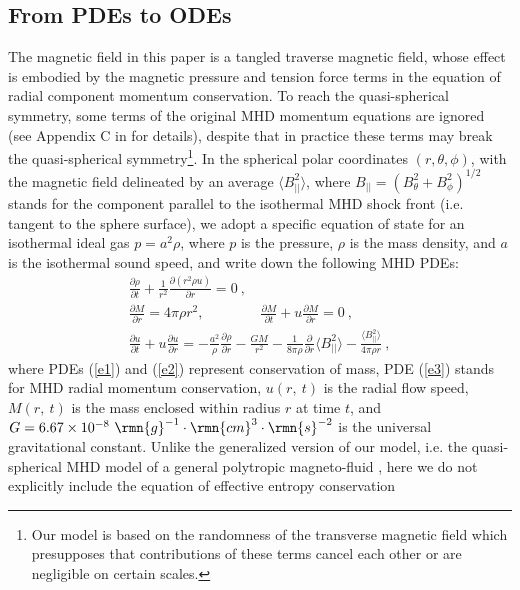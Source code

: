 \documentclass[fleqn,usenatbib]{mnras}
\begin{document}
\subsection{From PDEs to ODEs}
\label{s2.1}
The magnetic field in this paper is a tangled traverse magnetic field, whose effect is embodied by the magnetic pressure and tension force terms in the equation of radial component momentum conservation. To reach the quasi-spherical symmetry, some terms of the original MHD momentum equations are ignored (see Appendix C in \citet{yuLou2005} for details), despite that in practice these terms may break the quasi-spherical symmetry\footnote{Our model is based on the randomness of the transverse magnetic field which presupposes that contributions of these terms cancel each other or are negligible on certain scales.}. In the spherical polar coordinates $(r, \theta,\phi)$, with the magnetic field delineated by an average $\langle B^{2}_{||}\rangle$, where $B_{||}=(B_{\theta}^{2}+B_{\phi}^{2})^{1/2}$ stands for the component parallel to the isothermal MHD shock front (i.e. tangent to the sphere surface), we adopt a specific equation of state for an isothermal ideal gas $p=a^{2}\rho$, where $p$ is the pressure, $\rho$ is the mass density, and $a$ is the isothermal sound speed, and write down the following MHD PDEs:
\begin{gather}
\frac{\partial\rho}{\partial t}+\frac{1}{r^{2}}\frac{\partial
  \left(r^{2}\rho u\right)}{\partial r}=0\ ,\label{e1}\\
\frac{\partial M}{\partial r}=4\pi\rho r^{2},
 \qquad\qquad \frac{\partial M}
  {\partial t}+u\frac{\partial M}{\partial r}=0\ ,\label{e2}\\
\frac{\partial u}{\partial t}+u\frac{\partial u}{\partial r}=-\frac{a^{2}}{\rho}\frac{\partial \rho}
 {\partial r}-\frac{GM}{r^{2}}-\frac{1}{8\pi\rho}
 \frac{\partial}{\partial r}\langle B^{2}_{||}\rangle
 -\frac{\langle B^{2}_{||}\rangle}{4\pi\rho r}\ ,\label{e3}
\end{gather}
where PDEs (\ref{e1}) and (\ref{e2}) represent conservation of mass, PDE (\ref{e3}) stands for MHD radial momentum conservation, $u(r,\ t)$ is the radial flow speed, $M(r,\ t)$ is the mass enclosed within radius $r$ at time $t$, and $G=6.67\times 10^{-8}~\rmn{g}^{-1}\cdot\rmn{cm}^{3}\cdot\rmn{s}^{-2}$ is the universal gravitational constant. Unlike the generalized version of our model, i.e. the quasi-spherical MHD model of a general polytropic magneto-fluid \citep{wang2008dynamic}, here we do not explicitly include the equation of effective entropy conservation 
\end{document}
